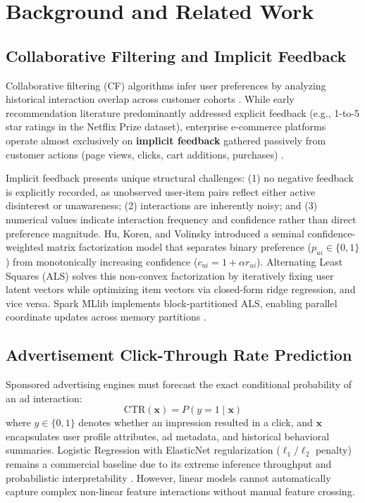 \documentclass[10pt,a4paper,twoside]{article}
\begin{document}
\section{Background and Related Work}

\subsection{Collaborative Filtering and Implicit Feedback}
Collaborative filtering (CF) algorithms infer user preferences by analyzing historical interaction overlap across customer cohorts \cite{su2009survey}. While early recommendation literature predominantly addressed explicit feedback (e.g., 1-to-5 star ratings in the Netflix Prize dataset), enterprise e-commerce platforms operate almost exclusively on \textbf{implicit feedback} gathered passively from customer actions (page views, clicks, cart additions, purchases) \cite{koren2009matrix}.

Implicit feedback presents unique structural challenges: (1) no negative feedback is explicitly recorded, as unobserved user-item pairs reflect either active disinterest or unawareness; (2) interactions are inherently noisy; and (3) numerical values indicate interaction frequency and confidence rather than direct preference magnitude. Hu, Koren, and Volinsky \cite{hu2008collaborative} introduced a seminal confidence-weighted matrix factorization model that separates binary preference ($p_{ui} \in \{0, 1\}$) from monotonically increasing confidence ($c_{ui} = 1 + \alpha r_{ui}$). Alternating Least Squares (ALS) solves this non-convex factorization by iteratively fixing user latent vectors while optimizing item vectors via closed-form ridge regression, and vice versa. Spark MLlib implements block-partitioned ALS, enabling parallel coordinate updates across memory partitions \cite{meng2016mllib}.

\subsection{Advertisement Click-Through Rate Prediction}
Sponsored advertising engines must forecast the exact conditional probability of an ad interaction:
\begin{equation}
\text{CTR}(\mathbf{x}) = P(y = 1 \mid \mathbf{x})
\end{equation}
where $y \in \{0, 1\}$ denotes whether an impression resulted in a click, and $\mathbf{x}$ encapsulates user profile attributes, ad metadata, and historical behavioral summaries. Logistic Regression with ElasticNet regularization ($\ell_1 / \ell_2$ penalty) remains a commercial baseline due to its extreme inference throughput and probabilistic interpretability \cite{mcmahan2013ad,chapelle2014simple}. However, linear models cannot automatically capture complex non-linear feature interactions without manual feature crossing.
\end{document}
